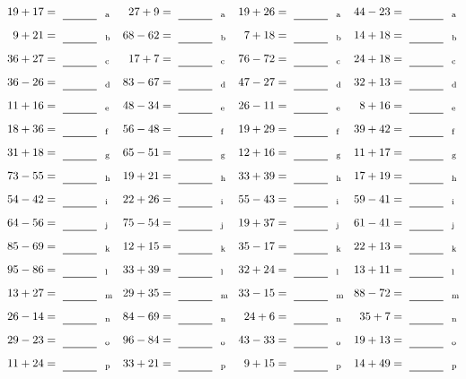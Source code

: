 \documentclass
[
  draft    = true,
  fontsize = 11pt,
  parskip  = half-
]
{scrartcl}
\begin{document}
\clearpage
\begin{align*}
    \pline{19+17}&=\rline{a}
  & \pline{27+9}&=\rline{a}
  & \pline{19+26}&=\rline{a}
  & \pline{44-23}&=\rline{a} \\[1ex]
    \pline{9+21}&=\rline{b}
  & \pline{68-62}&=\rline{b}
  & \pline{7+18}&=\rline{b}
  & \pline{14+18}&=\rline{b} \\[1ex]
    \pline{36+27}&=\rline{c}
  & \pline{17+7}&=\rline{c}
  & \pline{76-72}&=\rline{c}
  & \pline{24+18}&=\rline{c} \\[1ex]
    \pline{36-26}&=\rline{d}
  & \pline{83-67}&=\rline{d}
  & \pline{47-27}&=\rline{d}
  & \pline{32+13}&=\rline{d} \\[1ex]
    \pline{11+16}&=\rline{e}
  & \pline{48-34}&=\rline{e}
  & \pline{26-11}&=\rline{e}
  & \pline{8+16}&=\rline{e} \\[1ex]
    \pline{18+36}&=\rline{f}
  & \pline{56-48}&=\rline{f}
  & \pline{19+29}&=\rline{f}
  & \pline{39+42}&=\rline{f} \\[1ex]
    \pline{31+18}&=\rline{g}
  & \pline{65-51}&=\rline{g}
  & \pline{12+16}&=\rline{g}
  & \pline{11+17}&=\rline{g} \\[1ex]
    \pline{73-55}&=\rline{h}
  & \pline{19+21}&=\rline{h}
  & \pline{33+39}&=\rline{h}
  & \pline{17+19}&=\rline{h} \\[1ex]
    \pline{54-42}&=\rline{i}
  & \pline{22+26}&=\rline{i}
  & \pline{55-43}&=\rline{i}
  & \pline{59-41}&=\rline{i} \\[1ex]
    \pline{64-56}&=\rline{j}
  & \pline{75-54}&=\rline{j}
  & \pline{19+37}&=\rline{j}
  & \pline{61-41}&=\rline{j} \\[1ex]
    \pline{85-69}&=\rline{k}
  & \pline{12+15}&=\rline{k}
  & \pline{35-17}&=\rline{k}
  & \pline{22+13}&=\rline{k} \\[1ex]
    \pline{95-86}&=\rline{l}
  & \pline{33+39}&=\rline{l}
  & \pline{32+24}&=\rline{l}
  & \pline{13+11}&=\rline{l} \\[1ex]
    \pline{13+27}&=\rline{m}
  & \pline{29+35}&=\rline{m}
  & \pline{33-15}&=\rline{m}
  & \pline{88-72}&=\rline{m} \\[1ex]
    \pline{26-14}&=\rline{n}
  & \pline{84-69}&=\rline{n}
  & \pline{24+6}&=\rline{n}
  & \pline{35+7}&=\rline{n} \\[1ex]
    \pline{29-23}&=\rline{o}
  & \pline{96-84}&=\rline{o}
  & \pline{43-33}&=\rline{o}
  & \pline{19+13}&=\rline{o} \\[1ex]
    \pline{11+24}&=\rline{p}
  & \pline{33+21}&=\rline{p}
  & \pline{9+15}&=\rline{p}
  & \pline{14+49}&=\rline{p}
\end{align*}
\end{document}
